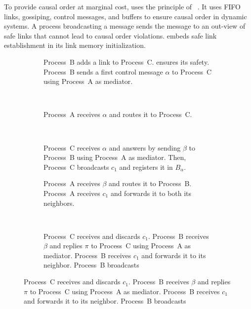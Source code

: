 
To provide causal order at marginal cost, \RPCBROADCAST uses the principle of
\PCBROADCAST~\cite{nedelec2018pcbroadcast}. It uses FIFO links, gossiping,
control messages, and buffers to ensure causal order in dynamic systems. A
process broadcasting a message sends the message to an out-view of safe links
that cannot lead to causal order violations. \RPCBROADCAST embeds safe link
establishment in its link memory initialization.

\begin{figure}
  \begin{center}
    \begin{subfigure}[t]{0.31\textwidth}
      \centering%
      \caption{\label{fig:solveA}Process~B adds a link to
        Process~C. \RPCBROADCAST ensures its safety. Process~B sends a first
        control message $\alpha$ to Process~C using Process~A as mediator.}
    \end{subfigure}
    ~
    \begin{subfigure}[t]{0.31\textwidth}
      \centering%
      \caption{\label{fig:solveB}Process~A receives $\alpha$ and routes it to
        Process~C.}
    \end{subfigure}
    ~
    \begin{subfigure}[t]{0.31\textwidth}
      \centering%
      \caption{\label{fig:solveC}Process~C receives $\alpha$ and answers by
        sending $\beta$ to Process~B using Process~A as mediator. Then,
        Process~C broadcasts $c_1$ and registers it in $B_\alpha$.}
    \end{subfigure}
    \begin{subfigure}[t]{0.48\textwidth}
      \centering%
      \caption{\label{fig:solveD}Process~A receives $\beta$ and routes it to
        Process~B.  Process~A receives $c_1$ and forwards it to both its
        neighbors.}
    \end{subfigure}
    ~
    \begin{subfigure}[t]{0.48\textwidth}
      \centering%
      \caption{\label{fig:solveE}Process~C receives and discards
        $c_1$.  Process~B receives $\beta$ and replies $\pi$ to
        Process~C using Process~A as mediator.  Process~B receives
        $c_1$ and forwards it to its neighbor.  Process~B broadcasts
}
\end{subfigure}
\end{center}
\end{figure}
